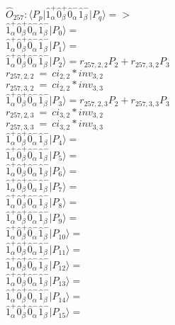 \documentclass[14pt]{article}
\begin{document}
    $\hat{O}_{257}:  \langle{P_p}\vert \hat{1}_{\alpha}^{+}\hat{0}_{\beta}^{+}\hat{0}_{\alpha}^{-}\hat{1}_{\beta}^{-} \vert{P_q}\rangle => $ \\ 
    $ \hat{1}_{\alpha}^{+}\hat{0}_{\beta}^{+}\hat{0}_{\alpha}^{-}\hat{1}_{\beta}^{-} \vert{P_{0}}\rangle =  $ \\ 
    $ \hat{1}_{\alpha}^{+}\hat{0}_{\beta}^{+}\hat{0}_{\alpha}^{-}\hat{1}_{\beta}^{-} \vert{P_{1}}\rangle =  $ \\ 
    $ \hat{1}_{\alpha}^{+}\hat{0}_{\beta}^{+}\hat{0}_{\alpha}^{-}\hat{1}_{\beta}^{-} \vert{P_{2}}\rangle = {r}_{257,2,2}P_{2}+{r}_{257,3,2}P_{3} $ \\ 
    ${r}_{257,2,2}\ =\ {ci}_{2,2}*{inv}_{3,2} $ \\ 
    ${r}_{257,3,2}\ =\ {ci}_{2,2}*{inv}_{3,3} $ \\ 
    $ \hat{1}_{\alpha}^{+}\hat{0}_{\beta}^{+}\hat{0}_{\alpha}^{-}\hat{1}_{\beta}^{-} \vert{P_{3}}\rangle = {r}_{257,2,3}P_{2}+{r}_{257,3,3}P_{3} $ \\ 
    ${r}_{257,2,3}\ =\ {ci}_{3,2}*{inv}_{3,2} $ \\ 
    ${r}_{257,3,3}\ =\ {ci}_{3,2}*{inv}_{3,3} $ \\ 
    $ \hat{1}_{\alpha}^{+}\hat{0}_{\beta}^{+}\hat{0}_{\alpha}^{-}\hat{1}_{\beta}^{-} \vert{P_{4}}\rangle =  $ \\ 
    $ \hat{1}_{\alpha}^{+}\hat{0}_{\beta}^{+}\hat{0}_{\alpha}^{-}\hat{1}_{\beta}^{-} \vert{P_{5}}\rangle =  $ \\ 
    $ \hat{1}_{\alpha}^{+}\hat{0}_{\beta}^{+}\hat{0}_{\alpha}^{-}\hat{1}_{\beta}^{-} \vert{P_{6}}\rangle =  $ \\ 
    $ \hat{1}_{\alpha}^{+}\hat{0}_{\beta}^{+}\hat{0}_{\alpha}^{-}\hat{1}_{\beta}^{-} \vert{P_{7}}\rangle =  $ \\ 
    $ \hat{1}_{\alpha}^{+}\hat{0}_{\beta}^{+}\hat{0}_{\alpha}^{-}\hat{1}_{\beta}^{-} \vert{P_{8}}\rangle =  $ \\ 
    $ \hat{1}_{\alpha}^{+}\hat{0}_{\beta}^{+}\hat{0}_{\alpha}^{-}\hat{1}_{\beta}^{-} \vert{P_{9}}\rangle =  $ \\ 
    $ \hat{1}_{\alpha}^{+}\hat{0}_{\beta}^{+}\hat{0}_{\alpha}^{-}\hat{1}_{\beta}^{-} \vert{P_{10}}\rangle =  $ \\ 
    $ \hat{1}_{\alpha}^{+}\hat{0}_{\beta}^{+}\hat{0}_{\alpha}^{-}\hat{1}_{\beta}^{-} \vert{P_{11}}\rangle =  $ \\ 
    $ \hat{1}_{\alpha}^{+}\hat{0}_{\beta}^{+}\hat{0}_{\alpha}^{-}\hat{1}_{\beta}^{-} \vert{P_{12}}\rangle =  $ \\ 
    $ \hat{1}_{\alpha}^{+}\hat{0}_{\beta}^{+}\hat{0}_{\alpha}^{-}\hat{1}_{\beta}^{-} \vert{P_{13}}\rangle =  $ \\ 
    $ \hat{1}_{\alpha}^{+}\hat{0}_{\beta}^{+}\hat{0}_{\alpha}^{-}\hat{1}_{\beta}^{-} \vert{P_{14}}\rangle =  $ \\ 
    $ \hat{1}_{\alpha}^{+}\hat{0}_{\beta}^{+}\hat{0}_{\alpha}^{-}\hat{1}_{\beta}^{-} \vert{P_{15}}\rangle =  $ \\ 
    
\end{document}
